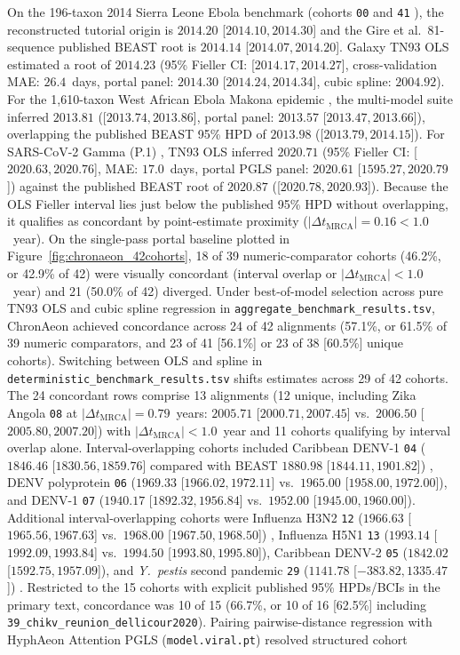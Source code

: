 \documentclass[11pt,letterpaper]{article}
\begin{document}
On the 196-taxon 2014 Sierra Leone Ebola benchmark (cohorts \texttt{00} and \texttt{41} \cite{hill2019skygrid, gire2014genomic}), the reconstructed tutorial origin is $2014.20$ [$2014.10, 2014.30$] and the Gire et al.\ 81-sequence published BEAST root is $2014.14$ [$2014.07, 2014.20$]. Galaxy TN93 OLS estimated a root of $2014.23$ (95\% Fieller CI: [$2014.17, 2014.27$], cross-validation MAE: $26.4$~days, portal panel: $2014.30$ [$2014.24, 2014.34$], cubic spline: $2004.92$). For the 1,610-taxon West African Ebola Makona epidemic \cite{dudas2017virus}, the multi-model suite inferred $2013.81$ ([$2013.74, 2013.86$], portal panel: $2013.57$ [$2013.47, 2013.66$]), overlapping the published BEAST 95\% HPD of $2013.98$ ([$2013.79, 2014.15$]). For SARS-CoV-2 Gamma (P.1) \cite{faria2021genomics}, TN93 OLS inferred $2020.71$ (95\% Fieller CI: [$2020.63, 2020.76$], MAE: $17.0$~days, portal PGLS panel: $2020.61$ [$1595.27, 2020.79$]) against the published BEAST root of $2020.87$ ([$2020.78, 2020.93$]). Because the OLS Fieller interval lies just below the published 95\% HPD without overlapping, it qualifies as concordant by point-estimate proximity ($|\Delta t_{\mathrm{MRCA}}| = 0.16 < 1.0$~year). On the single-pass portal baseline plotted in Figure~\ref{fig:chronaeon_42cohorts}, 18 of 39 numeric-comparator cohorts (46.2\%, or 42.9\% of 42) were visually concordant (interval overlap or $|\Delta t_{\mathrm{MRCA}}| < 1.0$~year) and 21 (50.0\% of 42) diverged. Under best-of-model selection across pure TN93 OLS and cubic spline regression in \texttt{aggregate\_benchmark\_results.tsv}, ChronAeon achieved concordance across 24 of 42 alignments (57.1\%, or 61.5\% of 39 numeric comparators, and 23 of 41 [56.1\%] or 23 of 38 [60.5\%] unique cohorts). Switching between OLS and spline in \texttt{deterministic\_benchmark\_results.tsv} shifts estimates across 29 of 42 cohorts. The 24 concordant rows comprise 13 alignments (12 unique, including Zika Angola \texttt{08} at $|\Delta t_{\mathrm{MRCA}}| = 0.79$~years: $2005.71$ [$2000.71, 2007.45$] vs.\ $2006.50$ [$2005.80, 2007.20$]) with $|\Delta t_{\mathrm{MRCA}}| < 1.0$~year and 11 cohorts qualifying by interval overlap alone. Interval-overlapping cohorts included Caribbean DENV-1 \texttt{04} ($1846.46$ [$1830.56, 1859.76$] compared with BEAST $1880.98$ [$1844.11, 1901.82$]) \cite{taylorsalmon2024travel}, DENV polyprotein \texttt{06} ($1969.33$ [$1966.02, 1972.11$] vs.\ $1965.00$ [$1958.00, 1972.00$]), and DENV-1 \texttt{07} ($1940.17$ [$1892.32, 1956.84$] vs.\ $1952.00$ [$1945.00, 1960.00$]). Additional interval-overlapping cohorts were Influenza H3N2 \texttt{12} ($1966.63$ [$1965.56, 1967.63$] vs.\ $1968.00$ [$1967.50, 1968.50$]) \cite{worobey2014flu}, Influenza H5N1 \texttt{13} ($1993.14$ [$1992.09, 1993.84$] vs.\ $1994.50$ [$1993.80, 1995.80$]), Caribbean DENV-2 \texttt{05} ($1842.02$ [$1592.75, 1957.09$]), and \textit{Y.\ pestis} second pandemic \texttt{29} ($1141.78$ [$-383.82, 1335.47$]) \cite{spyrou2019plague}. Restricted to the 15 cohorts with explicit published 95\% HPDs/BCIs in the primary text, concordance was 10 of 15 (66.7\%, or 10 of 16 [62.5\%] including \texttt{39\_chikv\_reunion\_dellicour2020}). Pairing pairwise-distance regression with HyphAeon Attention PGLS (\texttt{model.viral.pt}) resolved structured cohort 
\end{document}
